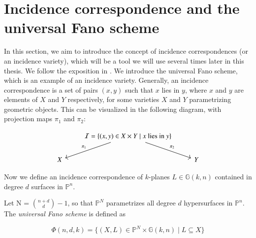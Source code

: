 \section{Incidence correspondence and the universal Fano scheme} 
\label{sec:fano}


In this section, we aim to introduce the concept of incidence correspondences (or an incidence variety), which will be a tool we will use several times later in this thesis. We follow the exposition in \cite[Section 6.1]{EH16}. We introduce the universal Fano scheme, which is an example of an incidence variety. Generally, an incidence correspondence is a set of pairs $(x,y)$ such that $x$ lies in $y$, where $x$ and $y$ are elements of $X$ and $Y$ respectively, for some varieties $X$ and $Y$ parametrizing geometric objects. This can be visualized in the following diagram, with projection maps $\pi_1$ and $\pi_2$:

\begin{equation} 
    \begin{tikzcd}
    & \mathcal{I} = \{(x,y) \in X \times Y \mid x \text{ lies in }y\} \arrow[dl, "\pi_1"'] \arrow[dr, "\pi_2"] & \\
    X  & & Y
    \end{tikzcd}
\end{equation}

Now we define an incidence correspondence of $k$-planes $L\in \mathbb{G}(k,n)$ contained in degree $d$ surfaces in $\mathbb{P}^n$. 

\begin{definition}
    Let N = $\binom{n+d}{d}-1$, so that $\mathbb{P}^N$ parametrizes all degree $d$ hypersurfaces in $\mathbb{P}^n$. The \emph{universal Fano scheme} is defined as

    \[\Phi(n,d,k) = \{(X, L) \in \mathbb{P}^N \times \mathbb{G}(k,n) \mid L \subseteq X\}\]
\end{definition}

